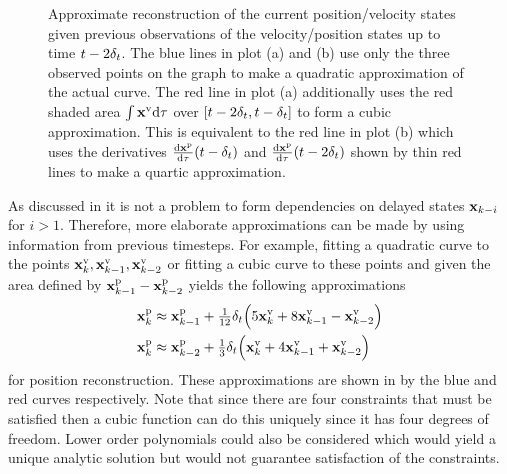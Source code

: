 \begin{figure}[t]
{
\label{fig:veldiff2}
}
%
\caption{Approximate reconstruction of the current position/velocity states given previous observations of the velocity/position states up to time $t-2\delta_t$. The blue lines in plot (a) and (b) use only the three observed points on the graph to make a quadratic approximation of the actual curve. The red line in plot (a) additionally uses the red shaded area $\int \mathbf{x}^{\text{v}} \mathrm{d}\tau$ over $[t-2\delta_t,t-\delta_t]$ to form a cubic approximation. This is equivalent to the red line in plot (b) which uses the derivatives $\frac{\mathrm{d}\mathbf{x}^{\text{p}}}{\mathrm{d} \tau}(t-\delta_t)$ and $\frac{\mathrm{d}\mathbf{x}^{\text{p}}}{\mathrm{d} \tau} (t-2\delta_t)$ shown by thin red lines to make a quartic approximation.}
\label{fig:posvel2}
\end{figure}





As discussed in  it is not a problem to form dependencies on delayed states $\mathbf{x}_{k-i}$ for $i >1$. Therefore, more elaborate approximations can be made by using information from previous timesteps. For example, fitting a quadratic curve to the points $\mathbf{x}^{\text{v}}_k, \mathbf{x}^{\text{v}}_{k-1}, \mathbf{x}^{\text{v}}_{k-2}$ or fitting a cubic curve to these points and given the area defined by $\mathbf{x}^{\text{p}}_{k-1} - \mathbf{x}^{\text{p}}_{k-2}$ yields the following approximations
\begin{align}
\mathbf{x}^{\text{p}}_{k} &\approx \mathbf{x}^{\text{p}}_{k-1} + \tfrac{1}{12}\delta_t\Big( 5\mathbf{x}^{\text{v}}_k + 8\mathbf{x}^{\text{v}}_{k-1} - \mathbf{x}^{\text{v}}_{k-2} \Big) \label{eqn:dada} \\
\mathbf{x}^{\text{p}}_{k} &\approx \mathbf{x}^{\text{p}}_{k-2} + \tfrac{1}{3}\delta_t\Big( \mathbf{x}^{\text{v}}_k + 4\mathbf{x}^{\text{v}}_{k-1} + \mathbf{x}^{\text{v}}_{k-2} \Big) \label{eqn:mama}
\end{align}
for position reconstruction. These approximations are shown in  by the blue and red curves respectively. Note that since there are four constraints that must be satisfied then a cubic function can do this uniquely since it has four degrees of freedom. Lower order polynomials could also be considered which would yield a unique analytic solution but would not guarantee satisfaction of the constraints.

